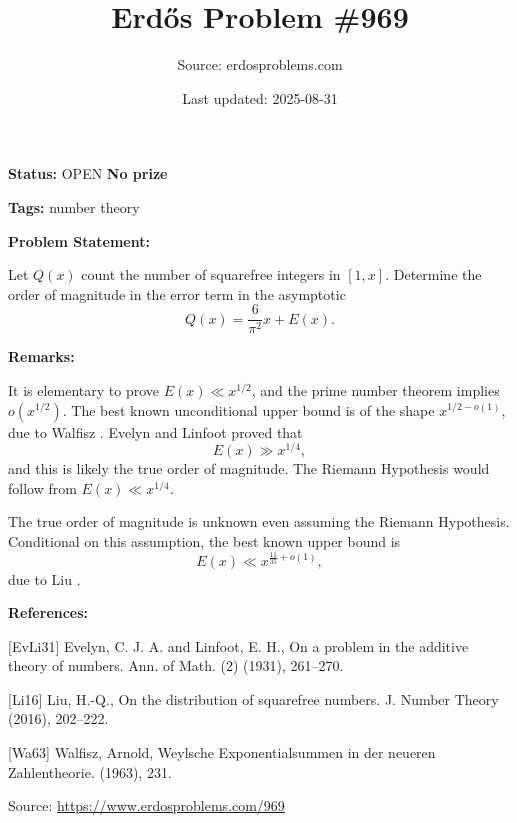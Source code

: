 \documentclass{article}
\title{Erd\H{o}s Problem \#969}
\date{Last updated: 2025-08-31}
\author{Source: erdosproblems.com}
\begin{document}
\maketitle

\noindent\textbf{Status:} OPEN \quad \textbf{No prize}

\noindent\textbf{Tags:} number theory

\medskip
\noindent\textbf{Problem Statement:}

Let $Q(x)$ count the number of squarefree integers in $[1,x]$. Determine the order of magnitude in the error term in the asymptotic\[Q(x)=\frac{6}{\pi^2}x+E(x).\]

\bigskip
\noindent\textbf{Remarks:}

It is elementary to prove $E(x)\ll x^{1/2}$, and the prime number theorem implies $o(x^{1/2})$. The best known unconditional upper bound is of the shape $x^{1/2-o(1)}$, due to Walfisz \cite{Wa63}. Evelyn and Linfoot \cite{EvLi31} proved that\[E(x) \gg x^{1/4},\]and this is likely the true order of magnitude. The Riemann Hypothesis would follow from $E(x)\ll x^{1/4}$. 

The true order of magnitude is unknown even assuming the Riemann Hypothesis. Conditional on this assumption, the best known upper bound is\[E(x)\ll x^{\frac{11}{35}+o(1)},\]due to Liu \cite{Li16}.

\bigskip
\noindent\textbf{References:}

[EvLi31] Evelyn, C. J. A. and Linfoot, E. H., On a problem in the additive theory of numbers. Ann. of Math. (2) (1931), 261--270.
 
 [Li16] Liu, H.-Q., On the distribution of squarefree numbers. J. Number Theory (2016), 202--222.
 
 [Wa63] Walfisz, Arnold, Weylsche {E}xponentialsummen in der neueren {Z}ahlentheorie. (1963), 231.

\bigskip
\noindent\small{Source: \url{https://www.erdosproblems.com/969}}
\end{document}
